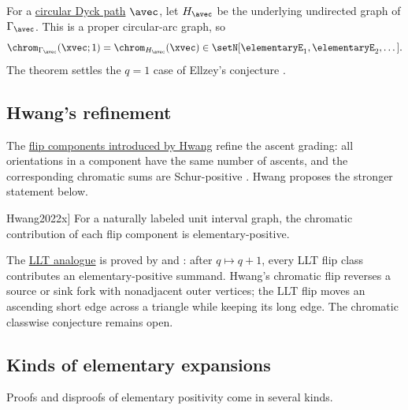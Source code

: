 For a \hyperref[circularDyckDiagram]{circular Dyck path} $\avec$, let
$H_\avec$ be the underlying undirected graph of $\Gamma_\avec$.
This is a proper circular-arc graph, so
\[
 \chrom_{\Gamma_\avec}(\xvec;1)=\chrom_{H_\avec}(\xvec)
 \in\setN[\elementaryE_1,\elementaryE_2,\dotsc].
\]
The theorem settles the $q=1$ case of Ellzey's conjecture
\cite{Ellzey2017,Vailaya2026x}.

\subsection[chromaticEFlipComponents]{Hwang's refinement}

The \hyperref[chromaticFlipComponents]{flip components introduced by Hwang}
refine the ascent grading: all orientations in a component have the same
number of ascents, and the corresponding chromatic sums are Schur-positive
\cite{Hwang2022x}. Hwang proposes the stronger statement below.

\begin{conjecture}[Hwang, \cite[Conj.~3.10]{Hwang2022x}]
\label{hwangFlipComponentConjecture}
For a naturally labeled unit interval graph, the chromatic contribution of
each flip component is elementary-positive.
\end{conjecture}

The \hyperref[unicellularLLTFlipClassExpansion]{LLT analogue} is proved by
 and 
\cite[Thm.~14]{AlexanderssonDai2026Flipx}: after $q\mapsto q+1$, every LLT
flip class contributes an elementary-positive summand. Hwang's chromatic
flip reverses a source or sink fork with nonadjacent outer vertices; the LLT
flip moves an ascending short edge across a triangle while keeping its long
edge. The chromatic classwise conjecture remains open.

\subsection[chromaticEExpansionMethods]{Kinds of elementary expansions}

Proofs and disproofs of elementary positivity come in several kinds.


